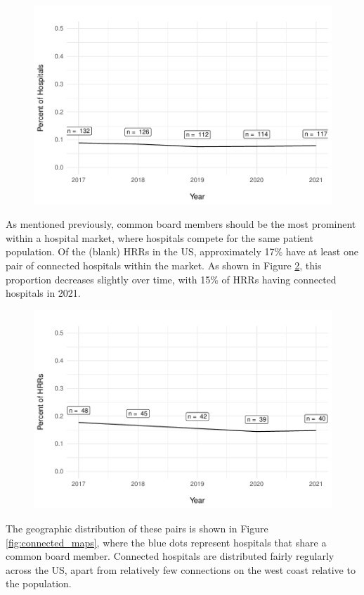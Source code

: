 \documentclass[12pt]{article}
\begin{document}
    \begin{figure}[ht!]
        \centering
        \includegraphics[width=.8\textwidth]{Objects/connected_percent.pdf}
        \label{fig:connected_percent}
    \end{figure}

    As mentioned previously, common board members should be the most prominent within a hospital market, where hospitals compete for the same patient population. Of the (blank) HRRs in the US, approximately 17\% have at least one pair of connected hospitals within the market. As shown in Figure \ref{fig:connected_HRR_percent}, this proportion decreases slightly over time, with 15\% of HRRs having connected hospitals in 2021.  

    \begin{figure}[ht!]
        \centering
        \includegraphics[width=.8\textwidth]{Objects/connected_HRR_percent.pdf}
        \label{fig:connected_HRR_percent}
    \end{figure}

    The geographic distribution of these pairs is shown in Figure \ref{fig:connected_maps}, where the blue dots represent hospitals that share a common board member. Connected hospitals are distributed fairly regularly across the US, apart from relatively few connections on the west coast relative to the population. 
\end{document}
